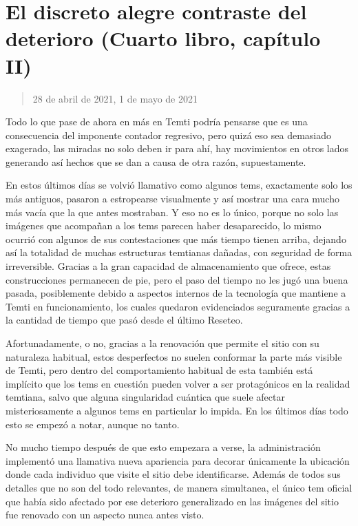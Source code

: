\documentclass[
  spanish,
]{book}
\begin{document}
\hypertarget{el-discreto-alegre-contraste-del-deterioro-cuarto-libro-capuxedtulo-ii}{%
\section{El discreto alegre contraste del deterioro (Cuarto libro, capítulo II)}\label{el-discreto-alegre-contraste-del-deterioro-cuarto-libro-capuxedtulo-ii}}

\begin{quote}
28 de abril de 2021, 1 de mayo de 2021
\end{quote}

Todo lo que pase de ahora en más en Temti podría pensarse que es una consecuencia del imponente contador regresivo, pero quizá eso sea demasiado exagerado, las miradas no solo deben ir para ahí, hay movimientos en otros lados generando así hechos que se dan a causa de otra razón, supuestamente.

En estos últimos días se volvió llamativo como algunos tems, exactamente solo los más antiguos, pasaron a estropearse visualmente y así mostrar una cara mucho más vacía que la que antes mostraban. Y eso no es lo único, porque no solo las imágenes que acompañan a los tems parecen haber desaparecido, lo mismo ocurrió con algunos de sus contestaciones que más tiempo tienen arriba, dejando así la totalidad de muchas estructuras temtianas dañadas, con seguridad de forma irreversible. Gracias a la gran capacidad de almacenamiento que ofrece, estas construcciones permanecen de pie, pero el paso del tiempo no les jugó una buena pasada, posiblemente debido a aspectos internos de la tecnología que mantiene a Temti en funcionamiento, los cuales quedaron evidenciados seguramente gracias a la cantidad de tiempo que pasó desde el último Reseteo.

Afortunadamente, o no, gracias a la renovación que permite el sitio con su naturaleza habitual, estos desperfectos no suelen conformar la parte más visible de Temti, pero dentro del comportamiento habitual de esta también está implícito que los tems en cuestión pueden volver a ser protagónicos en la realidad temtiana, salvo que alguna singularidad cuántica que suele afectar misteriosamente a algunos tems en particular lo impida. En los últimos días todo esto se empezó a notar, aunque no tanto.

No mucho tiempo después de que esto empezara a verse, la administración implementó una llamativa nueva apariencia para decorar únicamente la ubicación donde cada individuo que visite el sitio debe identificarse. Además de todos sus detalles que no son del todo relevantes, de manera simultanea, el único tem oficial que había sido afectado por ese deterioro generalizado en las imágenes del sitio fue renovado con un aspecto nunca antes visto.
\end{document}
